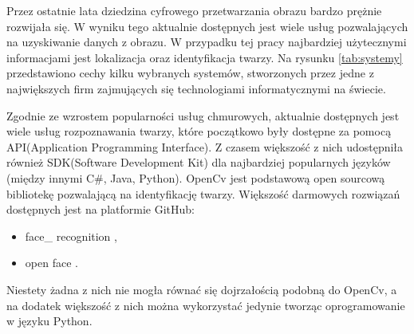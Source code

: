 Przez ostatnie lata dziedzina cyfrowego przetwarzania obrazu bardzo prężnie rozwijała się. W wyniku tego aktualnie dostępnych jest wiele usług pozwalających na uzyskiwanie danych z obrazu. W przypadku tej pracy najbardziej użytecznymi informacjami jest lokalizacja oraz identyfikacja twarzy.
Na rysunku \ref{tab:systemy} przedstawiono cechy kilku wybranych systemów, stworzonych przez jedne z największych firm zajmujących się technologiami informatycznymi na świecie.

\begin{table}[H]\label{tab:systemy}
	\centering
	\caption{Dostępne systemy przetwarzania obrazu}
\end{table}
Zgodnie ze wzrostem popularności usług chmurowych, aktualnie dostępnych jest wiele usług rozpoznawania twarzy, które początkowo były dostępne za pomocą API(Application Programming Interface). Z czasem większość z nich udostępniła również SDK(Software Development Kit) dla najbardziej popularnych języków (między innymi C\#, Java, Python). OpenCv \cite{opencv_doc} jest podstawową open sourcową bibliotekę pozwalającą na identyfikację twarzy. Większość darmowych rozwiązań dostępnych jest na platformie GitHub:
\begin{itemize}
\item face\_ recognition \cite{face_reco_github},
\item open face \cite{open_face}.
\end{itemize}
Niestety żadna z nich nie mogła równać się dojrzałością podobną do OpenCv, a na dodatek większość z nich
można wykorzystać jedynie tworząc oprogramowanie w języku Python.

